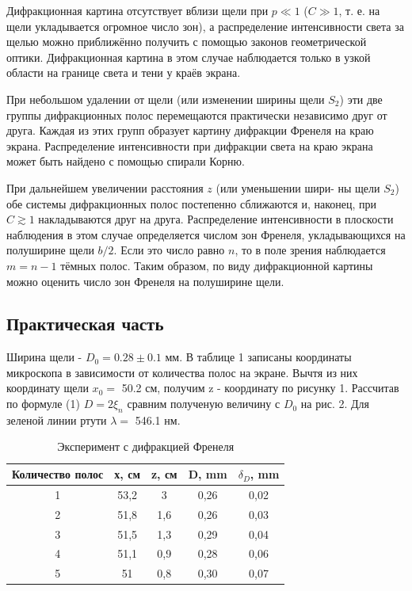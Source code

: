 \documentclass[a4paper, 12pt]{article}
\begin{document}
Дифракционная картина отсутствует вблизи щели при $ p \ll 1 $
($ C \gg 1 $, т. е. на щели укладывается огромное число зон), а распределение интенсивности света за щелью можно приближённо получить
с помощью законов геометрической оптики. Дифракционная картина
в этом случае наблюдается только в узкой области на границе света и
тени у краёв экрана.

При небольшом удалении от щели (или изменении ширины щели $ S_2 $) эти две группы дифракционных полос перемещаются практически независимо друг от друга. Каждая из этих групп образует картину дифракции Френеля на краю экрана. Распределение интенсивности
при дифракции света на краю экрана может быть найдено с помощью
спирали Корню.

При дальнейшем увеличении расстояния $ z $ (или уменьшении шири-
ны щели $ S_2 $) обе системы дифракционных полос постепенно сближаются и, наконец, при $ C \gtrsim 1 $ накладываются друг на друга. Распределение интенсивности в плоскости наблюдения в этом случае определяется
числом зон Френеля, укладывающихся на полуширине щели $ b/2 $. Если это число равно $ n $, то в поле зрения наблюдается $ m = n - 1 $ тёмных полос. Таким образом, по виду дифракционной картины можно оценить
число зон Френеля на полуширине щели.

\subsection{Практическая часть}

Ширина щели - $D_0 = 0.28 \pm 0.1$ мм. В таблице 1 записаны координаты микроскопа в зависимости от количества полос на экране. Вычтя из них координату щели $x_0 =$ 50.2 см, получим z - координату по рисунку 1. Рассчитав по формуле (1) $D= 2\xi_n $ сравним полученую величину с $D_0$ на рис. 2. Для зеленой линии ртути $\lambda = $ 546.1 нм.

\begin{table}[h!]
\begin{center}
\caption{Эксперимент с дифракцией Френеля}
\begin{tabular}{|c|c|c|c|c|}
\hline
Количество полос & х, см & z, см & D, mm & $\delta_D$, mm \\ \hline
1                & 53,2  & 3     & 0,26  & 0,02           \\ \hline
2                & 51,8  & 1,6   & 0,26  & 0,03           \\ \hline
3                & 51,5  & 1,3   & 0,29  & 0,04           \\ \hline
4                & 51,1  & 0,9   & 0,28  & 0,06           \\ \hline
5                & 51    & 0,8   & 0,30  & 0,07           \\ \hline
\end{tabular}
\end{center}
\end{table}
\end{document}
